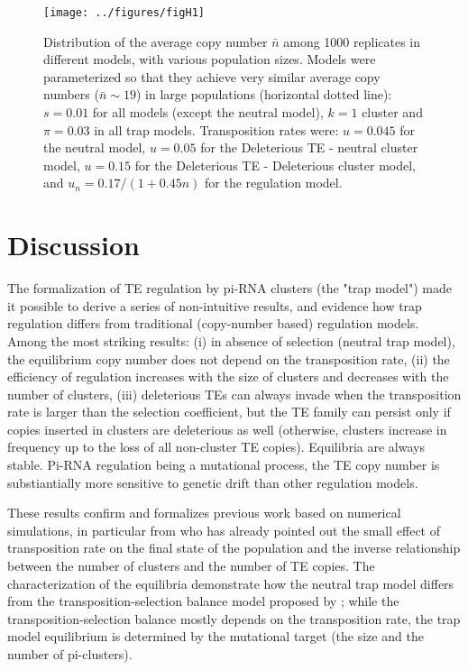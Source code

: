 \documentclass[10pt,a4paper]{article}
\begin{document}
\begin{figure}
\begin{adjustwidth}{-1in}{0in}
\begin{center}
	\texttt{[image: ../figures/figH1]}
\caption{\label{fig:figH1} Distribution of the average copy number $\bar n$ among 1000 replicates in different models, with various population sizes. Models were parameterized so that they achieve very similar average copy numbers ($\bar n \sim 19$) in large populations (horizontal dotted line): $s=0.01$ for all models (except the neutral model), $k=1$ cluster and $\pi =0.03$ in all trap models. Transposition rates were: $u=0.045$ for the neutral model, $u=0.05$ for the Deleterious TE - neutral cluster model, $u=0.15$ for the Deleterious TE - Deleterious cluster model, and $u_n=0.17/(1+0.45 n)$ for the regulation model. }
\end{center}\end{adjustwidth}
\end{figure}


\section{Discussion}

The formalization of TE regulation by pi-RNA clusters (the "trap model") made it possible to derive a series of non-intuitive results, and evidence how trap regulation differs from traditional (copy-number based) regulation models. Among the most striking results: (i) in absence of selection (neutral trap model), the equilibrium copy number does not depend on the transposition rate, (ii) the efficiency of regulation increases with the size of clusters and decreases with the number of clusters, (iii) deleterious TEs can always invade when the transposition rate is larger than the selection coefficient, but the TE family can persist only if copies inserted in clusters are deleterious as well (otherwise, clusters increase in frequency up to the loss of all non-cluster TE copies). Equilibria are always stable. Pi-RNA regulation being a mutational process, the TE copy number is substiantially more sensitive to genetic drift than other regulation models. 

These results confirm and formalizes previous work based on numerical simulations, in particular from \cite{Kof19} who has already pointed out the small effect of transposition rate on the final state of the population and the inverse relationship between the number of clusters and the number of TE copies. The characterization of the equilibria demonstrate how the neutral trap model differs from the transposition-selection balance model proposed by \cite{CC83}; while the transposition-selection balance mostly depends on the transposition rate, the trap model equilibrium is determined by the mutational target (the size and the number of pi-clusters). 
\end{document}
